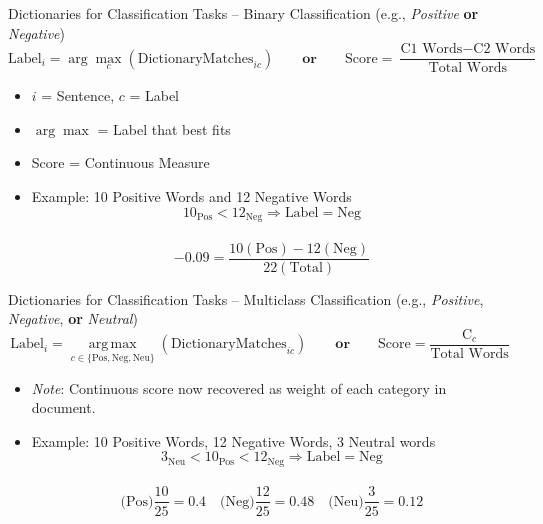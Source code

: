 \documentclass[
  ignorenonframetext,
  aspectratio=169]{beamer}
\begin{document}
\begin{frame}{Dictionaries for Classification Tasks -- Binary
Classification (e.g., \textit{Positive} \textbf{or} \textit{Negative})}
\label{dictionaries-for-classification-tasks-binary-classification-e.g.}
\[
\text{Label}_i = \arg\max_{c} \left( \text{DictionaryMatches}_{ic} \right)
\qquad \textbf{or} \qquad
\text{Score} = \frac{\text{C1 Words} - \text{C2 Words}}{\text{Total Words}}
\] \vspace{5mm}

\begin{itemize}
\item $i$ = Sentence, $c$ = Label 
\item $\arg\max$ = Label that best fits
\item Score = Continuous Measure
\item Example: 10 Positive Words and 12 Negative Words \\ $$10_{\text{Pos}} < 12_{\text{Neg}} \Rightarrow \text{Label} = \text{Neg}
  $$ \\  $$ -0.09 = \frac{10(\text{Pos})-12(\text{Neg})}{22(\text{Total})} $$
  \end{itemize}
\end{frame}

\begin{frame}{Dictionaries for Classification Tasks -- Multiclass
Classification (e.g., \textit{Positive}, \textit{Negative}, \textbf{or}
\textit{Neutral})}
\label{dictionaries-for-classification-tasks-multiclass-classification-e.g.}
\[
\text{Label}_i = \operatorname*{arg\,max}_{c \in \{\text{Pos}, \text{Neg}, \text{Neu}\}} \left( \text{DictionaryMatches}_{ic} \right)
\qquad \textbf{or} \qquad
\text{Score} = \frac{\text{C}_{c}}{\text{Total Words}}
\] \vspace{5mm}

\begin{itemize}
\item \textit{Note}: Continuous score now recovered as weight of each category in document. 
\item Example: 10 Positive Words, 12 Negative Words, 3 Neutral words \\ $$3_{\text{Neu}} < 10_{\text{Pos}} < 12_{\text{Neg}} \Rightarrow \text{Label} = \text{Neg}$$ \\  
$$ \text{(Pos)} \frac{10}{25}= 0.4 \quad \text{(Neg)}\frac{12}{25}=0.48 \quad \text{(Neu)}\frac{3}{25}=0.12$$
\end{itemize}
\end{frame}
\end{document}
